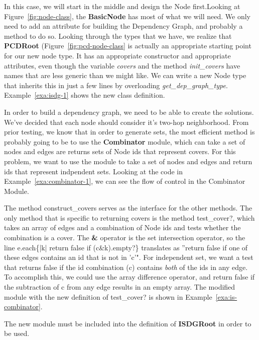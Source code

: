 In this case, we will start in the middle and design the Node first.Looking at Figure~\ref{fig:node-class}, the {\bfseries BasicNode} has most of what we will need. We only need to add an attribute for building the Dependency Graph, and probably a method to do so. Looking through the types that we have, we realize that {\bfseries PCDRoot} (Figure~\ref{fig:pcd-node-class} is actually an appropriate starting point for our new node type. It has an appropriate constructor and appropriate attributes, even though the variable {\em covers} and the method {\em init\_covers} have names that are less generic than we might like. We can write a new Node type that inherits this in just a few lines by overloading {\em get\_dep\_graph\_type}. Example~\ref{exa:isdg-1} shows the new class definition.



In order to build a dependency graph, we need to be able to create the solutions. We've decided that each node should consider it's two-hop neighborhood. From prior testing, we know that in order to generate sets, the most efficient method is probably going to be to use the {\bfseries Combinator} module, which can take a set of nodes and edges are returns sets of Node ids that represent covers. For this problem, we want to use the module to take a set of nodes and edges and return ids that represent indpendent sets. Looking at the code in Example~\ref{exa:combinator-1}, we can see the flow of control in the Combinator Module. 

The method {\ttfamily construct\_covers} serves as the interface for the other methods. The only method that is specific to returning covers is the method {\ttfamily test\_cover?}, which takes an array of edges and a combination of Node ids and tests whether the combination is a cover. The {\bfseries \&} operator is the set intersection operator, so the line {\ttfamily e.each\{|k| return false if (c&k).empty?\}} translates as ''return false if one of these edges contains an id that is not in 'c'". For independent set, we want a test that returns false if the id combination (c) contains {\em both} of the ids in any edge. To accomplish this, we could use the array difference operator, and return false if the subtraction of c from any edge results in an empty array. The modified module with the new definition of {\ttfamily test\_cover?} is shown in Example~\ref{exa:is-combinator}.  

The new module must be included into the definition of {\bf ISDGRoot} in order to be used.  
